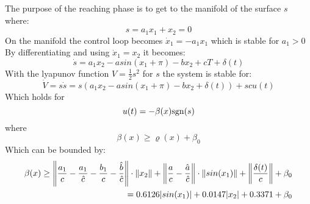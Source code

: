 The purpose of the reaching phase is to get to the manifold of the surface $s $ where:
\begin{equation}
  s = a_1 x_1 + x_2 = 0
\end{equation}
On the manifold the control loop becomes $ \dot{x}_1 = - a_1 x_1   $ which is stable for $ a_1 > 0$
By differentiating and using $ \dot{x}_1 = x_2 $ it becomes:
\begin{equation}
  \dot{s} = a_1 x_2 - a sin(x_1 + \pi) - b x_2 + c T + \delta (t)
\end{equation}
With the lyapunov function $V = \frac{1}{2} s^2 $ for $ s $ the system is stable for:
\begin{equation}
  \dot{V} = s \dot{s} =  s (a_1 x_2 - a sin(x_1 + \pi) - b x_2  + \delta (t) ) + s c u(t)
\end{equation}
Which holds for
\begin{equation}
  u(t) = -\beta (x) \mathrm{sgn}(s)
\end{equation}
where
\begin{equation}
  \beta (x) \geq \varrho (x) + \beta_0
\end{equation}
Which can be bounded by:
\begin{equation}
  \begin{split}
    \beta (x) \geq \left\Vert \frac{a_1}{c} - \frac{a_1}{\hat{c}} -  \frac{b_1}{c} - \frac{\hat{b}}{\hat{c}}  \right\Vert \cdot \left\Vert x_2 \right\Vert + \left\Vert \frac{a}{c} - \frac{\hat{a}}{\hat{c}}  \right\Vert \cdot \left\Vert sin(x_1) \right\Vert + \left\Vert \frac{\delta (t)}{c} \right\Vert + \beta_0 \\
    = 0.6126 |sin(x_1)| + 0.0147 |x_2| + 0.3371 + \beta_0
  \end{split}
\end{equation}
